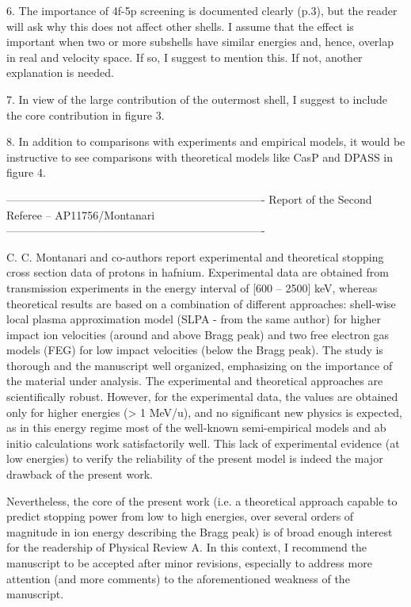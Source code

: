 6. The importance of 4f-5p screening is documented clearly (p.3), but 
the reader will ask why this does not affect other shells. I assume 
that the effect is important when two or more subshells have similar 
energies and, hence, overlap in real and velocity space. If so, I 
suggest to mention this. If not, another explanation is needed.

7. In view of the large contribution of the outermost shell, I suggest 
to include the core contribution in figure 3.

8. In addition to comparisons with experiments and empirical models, 
it would be instructive to see comparisons with theoretical models like 
CasP and DPASS in figure 4.

----------------------------------------------------------------------
Report of the Second Referee -- AP11756/Montanari
----------------------------------------------------------------------

C. C. Montanari and co-authors report experimental and theoretical
stopping cross section data of protons in hafnium. Experimental data
are obtained from transmission experiments in the energy interval of
[600 – 2500] keV, whereas theoretical results are based on a
combination of different approaches: shell-wise local plasma
approximation model (SLPA - from the same author) for higher impact
ion velocities (around and above Bragg peak) and two free electron gas
models (FEG) for low impact velocities (below the Bragg peak). The
study is thorough and the manuscript well organized, emphasizing on
the importance of the material under analysis. The experimental and
theoretical approaches are scientifically robust. However, for the
experimental data, the values are obtained only for higher energies (>
1 MeV/u), and no significant new physics is expected, as in this
energy regime most of the well-known semi-empirical models and ab
initio calculations work satisfactorily well. This lack of
experimental evidence (at low energies) to verify the reliability of
the present model is indeed the major drawback of the present work.

Nevertheless, the core of the present work (i.e. a theoretical
approach capable to predict stopping power from low to high energies,
over several orders of magnitude in ion energy describing the Bragg
peak) is of broad enough interest for the readership of Physical
Review A. In this context, I recommend the manuscript to be accepted    
after minor revisions, especially to address more attention (and more
comments) to the aforementioned weakness of the manuscript.

